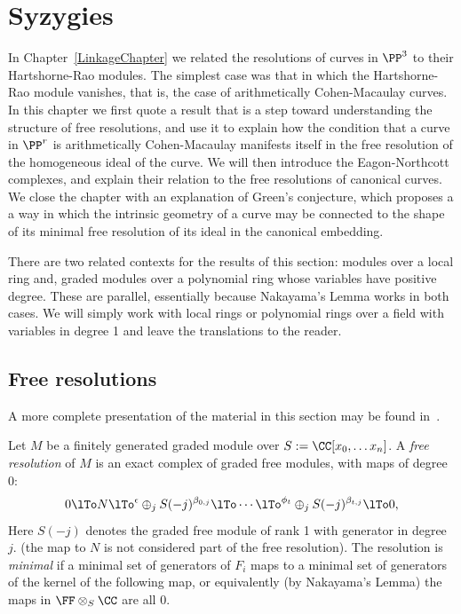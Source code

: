 

\chapter{Syzygies}
\label{SyzygiesChapter}

\def\length{{\rm length}}



In Chapter~\ref{LinkageChapter} we related the resolutions of curves in $\PP^3$ to their Hartshorne-Rao modules. The
simplest case was that in which the Hartshorne-Rao module vanishes, that is, the case of arithmetically Cohen-Macaulay curves.
In this chapter we first quote a result that is a step toward understanding the structure of free resolutions, and use it to explain how the condition that a curve in $\PP^r$ is arithmetically Cohen-Macaulay manifests itself in the 
free resolution of the homogeneous ideal of the curve.  We will then introduce the Eagon-Northcott complexes, and explain their relation to the free resolutions of canonical curves. We close the chapter with an explanation of Green's conjecture, which proposes a a way in which the intrinsic geometry
of a curve may be connected to the shape of its minimal free resolution of its ideal in the canonical embedding.

\begin{remark}
 There are two related contexts for the results of this section:  modules over a local ring and, graded modules over a polynomial ring whose variables have positive degree. These are parallel, essentially because Nakayama's Lemma works in both cases. We will simply work with local rings or polynomial rings over a field with variables in degree 1 and leave the translations to the reader.\end{remark}

\section{Free resolutions}
A more complete presentation of the material in this section may be found in~\cite[Chapter ****]{Eisenbud1995}.


Let $M$ be a finitely generated graded module over $S := \CC[x_0, \dots x_n]$. A \emph{free resolution} of $M$ is an exact complex
of graded free modules, with maps of degree 0:
$$
0\lTo N \lTo^\epsilon \oplus_jS(-j)^{\beta_{0,j}} \lTo\cdots
 \lTo^{\phi_t}\oplus_jS(-j)^{\beta_{t,j}}\lTo 0,
$$
Here $S(-j)$ denotes the graded free module of rank 1 with generator in degree $j$.
(the map to $N$ is not considered part of the free resolution). The resolution is \emph{minimal} if a minimal set of generators of $F_i$ maps to a minimal set of generators of the kernel of the following map,
or equivalently (by Nakayama's Lemma) the maps in $\FF\otimes_S \CC$ are all 0.

